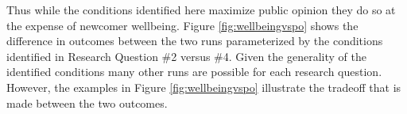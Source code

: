 \documentclass{scspaperproc}
\theoremstyle{scsthe}
\begin{document}
Thus while the conditions identified here maximize public opinion they do so at the expense of newcomer wellbeing. Figure \ref{fig:wellbeingvspo} shows the difference in outcomes between the two runs parameterized by the conditions identified in Research Question \#2 versus \#4. Given the generality of the identified conditions many other runs are possible for each research question. However, the examples in Figure \ref{fig:wellbeingvspo} illustrate the tradeoff that is made between the two outcomes. 

\end{document}
